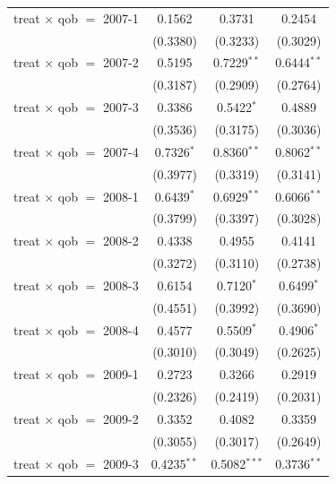 \begin{table}[htbp]
\begin{tabular}{lccc}
      treat $\times$ qob $=$ 2007-1  & 0.1562        & 0.3731         & 0.2454\\   
                                     & (0.3380)      & (0.3233)       & (0.3029)\\   
      treat $\times$ qob $=$ 2007-2  & 0.5195        & 0.7229$^{**}$  & 0.6444$^{**}$\\   
                                     & (0.3187)      & (0.2909)       & (0.2764)\\   
      treat $\times$ qob $=$ 2007-3  & 0.3386        & 0.5422$^{*}$   & 0.4889\\   
                                     & (0.3536)      & (0.3175)       & (0.3036)\\   
      treat $\times$ qob $=$ 2007-4  & 0.7326$^{*}$  & 0.8360$^{**}$  & 0.8062$^{**}$\\   
                                     & (0.3977)      & (0.3319)       & (0.3141)\\   
      treat $\times$ qob $=$ 2008-1  & 0.6439$^{*}$  & 0.6929$^{**}$  & 0.6066$^{**}$\\   
                                     & (0.3799)      & (0.3397)       & (0.3028)\\   
      treat $\times$ qob $=$ 2008-2  & 0.4338        & 0.4955         & 0.4141\\   
                                     & (0.3272)      & (0.3110)       & (0.2738)\\   
      treat $\times$ qob $=$ 2008-3  & 0.6154        & 0.7120$^{*}$   & 0.6499$^{*}$\\   
                                     & (0.4551)      & (0.3992)       & (0.3690)\\   
      treat $\times$ qob $=$ 2008-4  & 0.4577        & 0.5509$^{*}$   & 0.4906$^{*}$\\   
                                     & (0.3010)      & (0.3049)       & (0.2625)\\   
      treat $\times$ qob $=$ 2009-1  & 0.2723        & 0.3266         & 0.2919\\   
                                     & (0.2326)      & (0.2419)       & (0.2031)\\   
      treat $\times$ qob $=$ 2009-2  & 0.3352        & 0.4082         & 0.3359\\   
                                     & (0.3055)      & (0.3017)       & (0.2649)\\   
      treat $\times$ qob $=$ 2009-3  & 0.4235$^{**}$ & 0.5082$^{***}$ & 0.3736$^{**}$\\   

\end{tabular}
\end{table}
